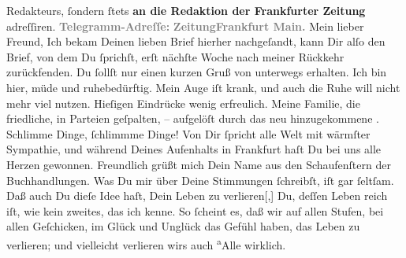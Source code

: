 \begin{ledgroupsized}[t]{13cm}
{{{{{{                                 Redakteurs, ſondern ſtets \textbf{an die Redaktion der Frankfurter Zeitung} adreſſiren}}.}}}}\pend
           \pstart
           \textcolor{gray}{\textbf{Telegramm-Adreſſe:}}\pend
           \pstart
           \textcolor{gray}{\textbf{\textbf{ZeitungFrankfurt Main.}}}\pend
           \pstart\center{}Mein lieber Freund,\pend\pstart
           Ich bekam Deinen lieben Brief hierher nachgeſandt, kann Dir alſo den Brief, von dem
               Du ſprichſt, erſt nächſte Woche nach meiner Rückkehr zurückfenden.\pend
           \pstart
           Du ſollſt nur einen kurzen Gruß von unterwegs erhalten. Ich bin hier, müde und
               ruhebedürftig. Mein  Auge iſt krank, und  auch die Ruhe will nicht mehr viel nutzen. Hieſigen
               Eindrücke wenig erfreulich. Meine Familie, die {\pb}friedliche, in  Parteien geſpalten, – aufgelöſt durch das neu hinzugekommene \label{K_L02771-1v}\label{K_L02771-1h}.
               Schlimme Dinge, ſchlimmme Dinge! \pend
           \pstart
           Von Dir ſpricht alle Welt mit wärmſter Sympathie, und während Deines Aufenhalts in
                  Frankfurt haſt Du bei uns alle Herzen
               gewonnen. Freundlich grüßt mich Dein Name aus den Schaufenſtern der
               Buchhandlungen.\pend
           \pstart
           Was Du mir über Deine Stimmungen ſchreibſt, iſt gar ſeltſam. Daß auch Du dieſe Idee
               haſt, Dein Leben zu verlieren{[},{]}{ }{\pb}Du, deſſen Leben reich iſt, wie kein zweites, das
               ich kenne. So ſcheint es, daß \strikeout{\textcolor{gray}{×}} wir auf allen Stufen, bei allen Geſchicken, im Glück und Unglück das Gefühl
               haben, das Leben zu verlieren; und vielleicht verlieren wirs auch \substVorne{}\textsuperscript{a}\substDazwischen{}A\substHinten{}lle wirklich.\pend
           \pstart

\end{ledgroupsized}
